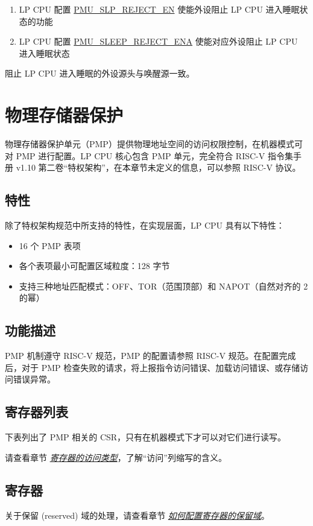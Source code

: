 \documentclass[main\_\_CN.tex]{subfiles}
\begin{document}
\begin{enumerate}
    \item LP CPU 配置 \hyperref[fielddesc:PMUSLPREJECTEN]{PMU\_SLP\_REJECT\_EN} 使能外设阻止 LP CPU 进入睡眠状态的功能
    \item LP CPU 配置 \hyperref[fielddesc:PMUSLEEPREJECTENA]{PMU\_SLEEP\_REJECT\_ENA} 使能对应外设阻止 LP CPU 进入睡眠状态
\end{enumerate}

阻止 LP CPU 进入睡眠的外设源头与唤醒源一致。

\section{物理存储器保护}\label{sec:pmp}

物理存储器保护单元（PMP）提供物理地址空间的访问权限控制，在机器模式可对 PMP 进行配置。LP CPU 核心包含 PMP 单元，完全符合 RISC-V 指令集手册 v1.10 第二卷“特权架构”，在本章节未定义的信息，可以参照 RISC-V 协议。

\subsection{特性}

除了特权架构规范中所支持的特性，在实现层面，LP CPU 具有以下特性：

\begin{itemize}
    \item 16 个 PMP 表项
    \item 各个表项最小可配置区域粒度：128 字节
    \item 支持三种地址匹配模式：OFF、TOR（范围顶部）和 NAPOT（自然对齐的 2 的幂）
\end{itemize}

\subsection{功能描述}
PMP 机制遵守 RISC-V 规范，PMP 的配置请参照 RISC-V 规范。在配置完成后，对于 PMP 检查失败的请求，将上报指令访问错误、加载访问错误、或存储访问错误异常。

\subsection{寄存器列表}
下表列出了 PMP 相关的 CSR，只有在机器模式下才可以对它们进行读写。

请查看章节 \hyperref[glossary-access-types]{\textit{寄存器的访问类型}}，了解“访问”列缩写的含义。





\subsection{寄存器}

关于保留 (reserved) 域的处理，请查看章节 \hyperref[programming-reserved-field]{\textit{如何配置寄存器的保留域}}。


\end{document}
